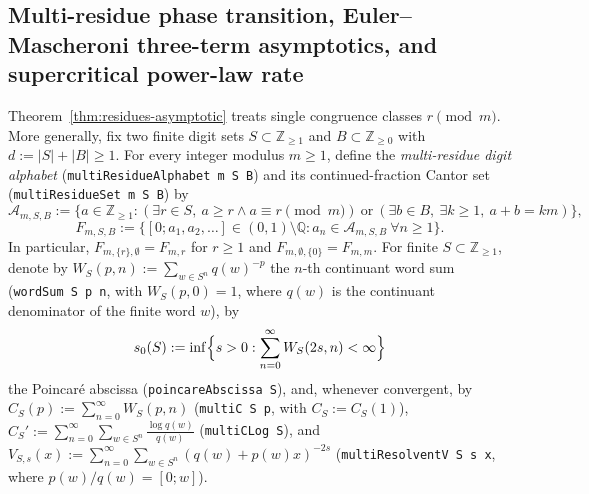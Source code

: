 \documentclass[11pt]{article}
\theoremstyle{definition}
\theoremstyle{remark}
\newcommand{\Z}{\mathbb{Z}}
\newcommand{\Q}{\mathbb{Q}}
\begin{document}
\subsection{Multi-residue phase transition, Euler--Mascheroni three-term asymptotics, and supercritical power-law rate}\label{sec:multi-residue}

Theorem~\ref{thm:residues-asymptotic} treats single congruence classes $r\pmod m$.
More generally, fix two finite digit sets $S\subset\Z_{\ge1}$ and
$B\subset\Z_{\ge0}$ with $d:=|S|+|B|\ge1$. For every integer modulus $m\ge1$,
define the \emph{multi-residue digit alphabet}
(\texttt{multiResidueAlphabet m S B}) and its continued-fraction Cantor set
(\texttt{multiResidueSet m S B}) by
\[
\mathcal A_{m,S,B}:=\bigl\{a\in\Z_{\ge1} : (\exists r\in S,\ a\ge r\wedge a\equiv r\!\!\pmod m)\ \text{or}\ (\exists b\in B,\ \exists k\ge1,\ a+b=km)\bigr\},
\]
\[
F_{m,S,B}:=\bigl\{[0;a_1,a_2,\dots]\in(0,1)\setminus\Q : a_n\in\mathcal A_{m,S,B}\ \forall n\ge1\bigr\}.
\]
In particular, $F_{m,\{r\},\emptyset}=F_{m,r}$ for $r\ge1$ and
$F_{m,\emptyset,\{0\}}=F_{m,m}$.
For finite $S\subset\Z_{\ge1}$, denote by $W_S(p,n):=\sum_{w\in S^n}q(w)^{-p}$
the $n$-th continuant word sum (\texttt{wordSum S p n}, with $W_S(p,0)=1$, where
$q(w)$ is the continuant denominator of the finite word $w$), by
\[
s_0(S):=\inf\Bigl\{s>0:\sum_{n=0}^\infty W_S(2s,n)<\infty\Bigr\}
\]
the Poincar\'e abscissa (\texttt{poincareAbscissa S}), and, whenever convergent,
by $C_S(p):=\sum_{n=0}^\infty W_S(p,n)$ (\texttt{multiC S p}, with $C_S:=C_S(1)$),
$C_S':=\sum_{n=0}^\infty\sum_{w\in S^n}\frac{\log q(w)}{q(w)}$ (\texttt{multiCLog S}),
and $V_{S,s}(x):=\sum_{n=0}^\infty\sum_{w\in S^n}(q(w)+p(w)x)^{-2s}$
(\texttt{multiResolventV S s x}, where $p(w)/q(w)=[0;w]$).
\end{document}
